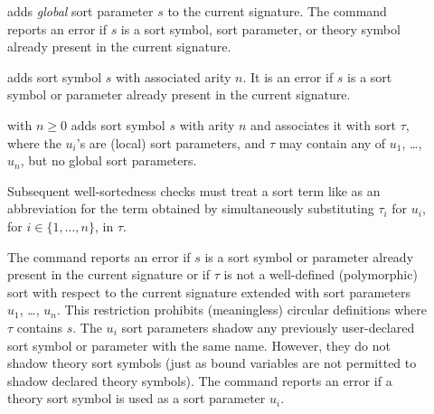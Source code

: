 \begin{description}

%
\item[]
adds \emph{global} sort parameter $s$ to the current signature.
The command reports an error if $s$ is a sort symbol, sort parameter, 
or theory symbol already present in the current signature.%

\smallskip

%
\item[]
adds sort symbol $s$ with associated arity $n$.
It is an error if $s$ is a sort symbol or parameter already present 
in the current signature.
\smallskip

%
\item[] with $n \geq 0$
adds sort symbol $s$ with arity $n$ and associates it with sort $\tau$,
where the $u_i$'s are (local) sort parameters, and $\tau$ may contain 
any of $u_1$, \dots, $u_n$, but no global sort parameters.


Subsequent well-sortedness checks must treat a sort term like
as an abbreviation for the term obtained by simultaneously substituting
$\tau_i$ for $u_i$, for $i\in\{1,\ldots,n\}$, in $\tau$.

The command reports an error
if $s$ is a sort symbol or parameter already present in the current signature or
if $\tau$ is not a well-defined (polymorphic) sort 
with respect to the current signature extended with sort parameters 
$u_1$, \dots, $u_n$.
This restriction prohibits (meaningless) circular definitions
where $\tau$ contains $s$.
The $u_i$ sort parameters shadow any previously user-declared sort symbol
or parameter with the same name.
However, they do not shadow theory sort symbols (just as bound variables are
not permitted to shadow declared theory symbols).
The command reports an error if a theory sort
symbol is used as a sort parameter $u_i$.


\end{description}
